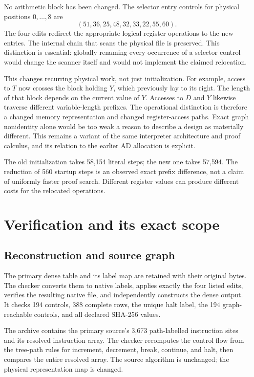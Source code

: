 \documentclass[11pt]{article}
\begin{document}
No arithmetic block has been changed. The selector entry controls for physical
positions $0,\ldots,8$ are
\[
 (51,36,25,48,32,33,22,55,60).
\]
The four edits redirect the appropriate logical register operations to the
new entries. The internal chain that scans the physical file is preserved.
This distinction is essential: globally renaming every occurrence of a
selector control would change the scanner itself and would not implement the
claimed relocation.

This changes recurring physical work, not just initialization. For example,
access to $T$ now crosses the block holding $Y$, which previously lay to its
right. The length of that block depends on the current value of $Y$. Accesses
to $D$ and $Y$ likewise traverse different variable-length prefixes. The
operational distinction is therefore a changed memory representation and
changed register-access paths. Exact graph nonidentity alone would be too
weak a reason to describe a design as materially different. This remains a
variant of the same interpreter architecture and proof calculus, and its
relation to the earlier AD allocation is explicit.

The old initialization takes 58,154 literal steps; the new one takes 57,594.
The reduction of 560 startup steps is an observed exact prefix difference,
not a claim of uniformly faster proof search. Different register values can
produce different costs for the relocated operations.



\section{Verification and its exact scope}

\subsection{Reconstruction and source graph}
The primary dense table and its label map are retained with their original
bytes. The checker converts them to native labels, applies exactly the four
listed edits, verifies the resulting native file, and independently constructs
the dense output. It checks 194 controls, 388 complete rows, the unique halt
label, the 194 graph-reachable controls, and all declared SHA-256 values.

The archive contains the primary source's 3,673 path-labelled instruction
sites and its resolved instruction array. The checker recomputes the control
flow from the tree-path rules for increment, decrement, break, continue, and
halt, then compares the entire resolved array. The source algorithm is
unchanged; the physical representation map is changed.
\end{document}
